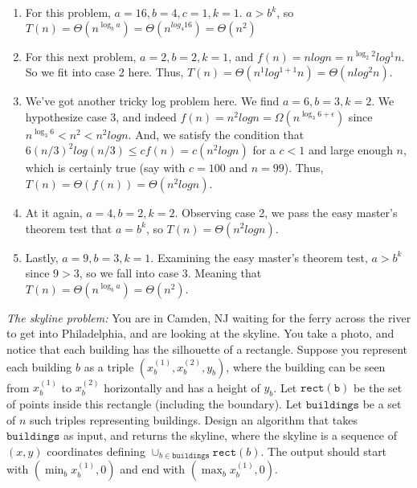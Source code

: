 \documentclass{article}
\begin{document}

\begin{enumerate}
	\item
		For this problem, $a=16, b=4, c=1, k=1$. $a>b^k$, so $T(n)=
		\Theta(n^{\log_{b} a}) = \Theta(n^{log_{4} 16}) = \Theta(n^2)$
	\item
		For this next problem, $a=2, b= 2, k=1$, and $f(n) = nlogn = 
		n^{\log_{2} 2}log^1n$. So we fit into case 2 here. 
		Thus, $T(n) = \Theta(n^1log^{1+1}n) =\Theta(nlog^2n)$.
	\item
		We've got another tricky log problem here. We find $a = 6,
		b=3, k = 2$. We hypothesize case 3, and indeed $f(n) = n^2logn
		= \Omega(n^{\log_{3} 6 + \epsilon})$ since $n^{\log_{3} 6 }< 
		n^2 < n^2logn$. And, we satisfy the condition that $6(n/3)^2
		log(n/3) \leq
		cf(n) = c(n^2logn)$ for a $c<1$ and large enough $n$, 
		which is certainly true (say with $c = 100$ and $n = 99$).
		Thus, $T(n) = \Theta(f(n)) = \Theta(n^2logn)$.
	\item
		At it again, $a = 4, b = 2, k = 2$. Observing case 2, we
		pass the easy master's theorem test that $a = b^k$, so
		$T(n) = \Theta(n^2logn)$.
	\item
		Lastly, $a = 9, b = 3, k = 1$. Examining the easy master's
		theorem test, $a > b^k$ since $9 > 3$, so we fall into case 3.
		Meaning that $T(n) = \Theta(n^{\log_{b}a}) = \Theta(n^2)$.
\end{enumerate}


\nextprob
{}

\emph{The skyline problem:} You are in Camden, NJ waiting for the ferry across the river to
get into Philadelphia, and are looking at the skyline.  You take a photo, and notice that each building
has the silhouette of a rectangle.  Suppose you  represent each building $b$ as a
triple $(x_b^{(1)},x_b^{(2)},y_b)$, where the building can be seen from $x_b^{(1)}$ to $x_b^{(2)}$
horizontally and has a height of $y_b$.  Let $\mathtt{rect(b)}$ be the set of
points inside this rectangle (including the boundary).  Let $\mathtt{buildings}$
be a set of $n$ such triples representing buildings. Design an algorithm that takes $\mathtt{buildings}$ as input, and
returns the skyline, where the skyline is a sequence of~$(x,y)$ coordinates
defining $\cup_{b \in \mathtt{buildings}} \mathtt{rect}(b)$.  The output should
start with $(\min_b{x_b^{(1)}},0)$ and end with $(\max_b{x_b^{(1)}},0)$.
\end{document}
